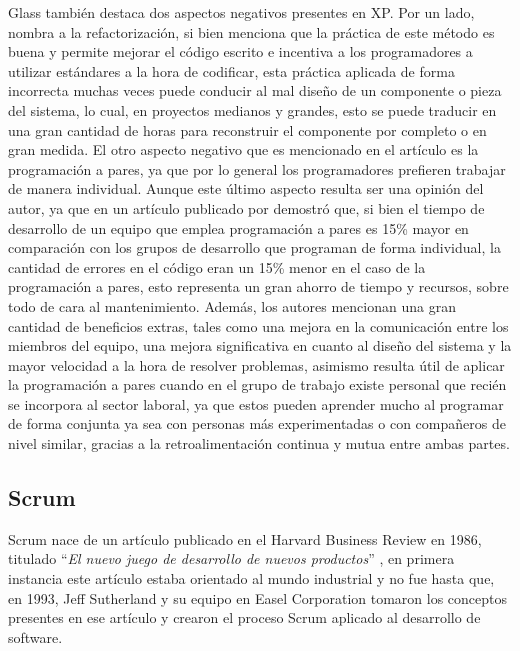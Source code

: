 \documentclass[a4paper,10pt]{article}
\begin{document}
	Glass también destaca dos aspectos negativos presentes en XP. Por un lado, nombra a la refactorización, si bien menciona que la práctica de este método es buena y permite mejorar el código escrito e incentiva a los programadores a utilizar estándares a la hora de codificar, esta práctica aplicada de forma incorrecta muchas veces puede conducir al mal diseño de un componente o pieza del sistema, lo cual, en proyectos medianos y grandes, esto se puede traducir en una gran cantidad de horas para reconstruir el componente por completo o en gran medida. El otro aspecto negativo que es mencionado en el artículo es la programación a pares, ya que por lo general los programadores prefieren trabajar de manera individual. Aunque este último aspecto resulta ser  una opinión del autor, ya que en un artículo publicado por \textcite{cockburn2000costs} demostró que, si bien el tiempo de desarrollo de un equipo que emplea programación a pares es 15\% mayor en comparación con los grupos de desarrollo que programan de forma individual, la cantidad de errores en el código eran un 15\% menor en el caso de la programación a pares, esto representa un gran ahorro de tiempo y recursos, sobre todo de cara al mantenimiento. Además, los autores mencionan una gran cantidad de beneficios extras, tales como una mejora en la comunicación entre los miembros del equipo, una mejora significativa en cuanto al diseño del sistema y la mayor velocidad a la hora de resolver problemas, asimismo resulta útil de aplicar la programación a pares cuando en el grupo de trabajo existe personal que recién se incorpora al sector laboral, ya que estos pueden aprender mucho al programar de forma conjunta ya sea con personas más experimentadas o con compañeros de nivel similar, gracias a la retroalimentación continua y mutua entre ambas partes.
	\subsection{Scrum}
	Scrum nace de un artículo publicado en el Harvard Business Review en 1986, titulado “\textit{El nuevo juego de desarrollo de nuevos productos}” \parencite{Takeuchi_Nonaka_1986}, en primera instancia este artículo estaba orientado al mundo industrial y no fue hasta que, en 1993, Jeff Sutherland y su equipo en Easel Corporation tomaron los conceptos presentes en ese artículo y crearon el proceso Scrum aplicado al desarrollo de software.
	
\end{document}
